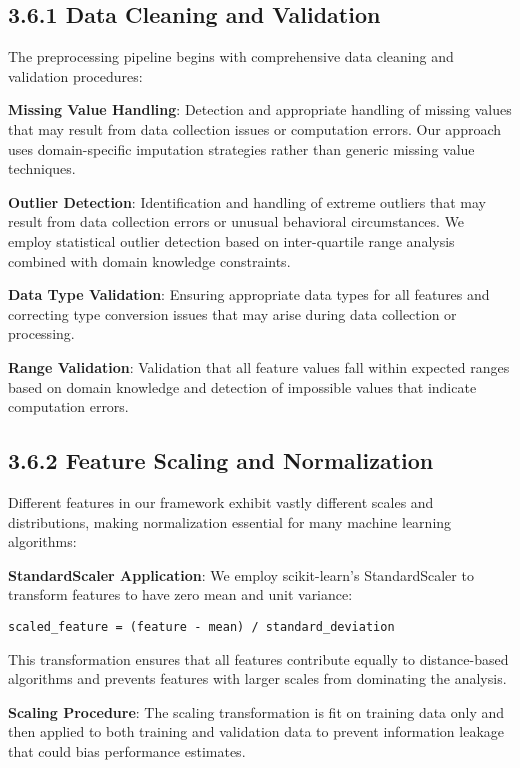 \documentclass[
  12pt,
  a4paper,
]{report}
\begin{document}
\subsection{3.6.1 Data Cleaning and
Validation}\label{data-cleaning-and-validation}

The preprocessing pipeline begins with comprehensive data cleaning and
validation procedures:

\textbf{Missing Value Handling}: Detection and appropriate handling of
missing values that may result from data collection issues or
computation errors. Our approach uses domain-specific imputation
strategies rather than generic missing value techniques.

\textbf{Outlier Detection}: Identification and handling of extreme
outliers that may result from data collection errors or unusual
behavioral circumstances. We employ statistical outlier detection based
on inter-quartile range analysis combined with domain knowledge
constraints.

\textbf{Data Type Validation}: Ensuring appropriate data types for all
features and correcting type conversion issues that may arise during
data collection or processing.

\textbf{Range Validation}: Validation that all feature values fall
within expected ranges based on domain knowledge and detection of
impossible values that indicate computation errors.

\subsection{3.6.2 Feature Scaling and
Normalization}\label{feature-scaling-and-normalization}

Different features in our framework exhibit vastly different scales and
distributions, making normalization essential for many machine learning
algorithms:

\textbf{StandardScaler Application}: We employ scikit-learn's
StandardScaler to transform features to have zero mean and unit
variance:

\begin{verbatim}
scaled_feature = (feature - mean) / standard_deviation
\end{verbatim}

This transformation ensures that all features contribute equally to
distance-based algorithms and prevents features with larger scales from
dominating the analysis.

\textbf{Scaling Procedure}: The scaling transformation is fit on
training data only and then applied to both training and validation data
to prevent information leakage that could bias performance estimates.
\end{document}

